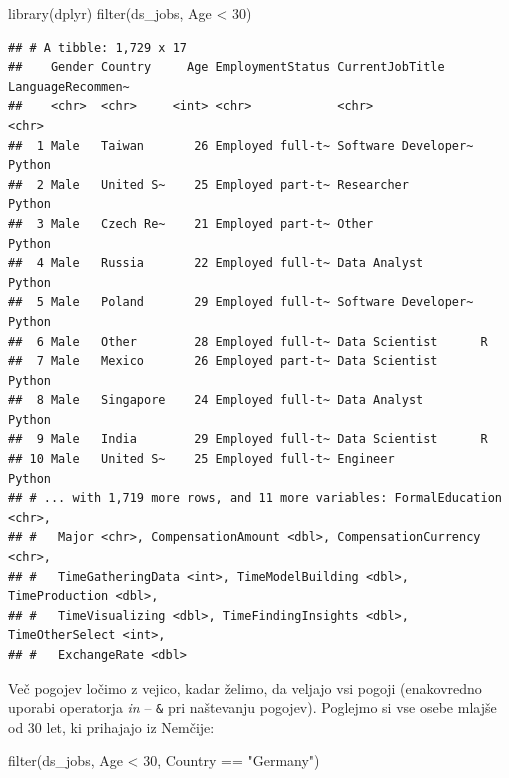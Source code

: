 \documentclass[
]{book}
\newenvironment{Shaded}{\begin{snugshade}}{\end{snugshade}}
\newcommand{\DecValTok}[1]{\textcolor[rgb]{0.00,0.00,0.81}{#1}}
\newcommand{\FunctionTok}[1]{\textcolor[rgb]{0.00,0.00,0.00}{#1}}
\newcommand{\NormalTok}[1]{#1}
\newcommand{\SpecialCharTok}[1]{\textcolor[rgb]{0.00,0.00,0.00}{#1}}
\newcommand{\StringTok}[1]{\textcolor[rgb]{0.31,0.60,0.02}{#1}}
\begin{document}
\begin{Shaded}
\begin{Highlighting}[]
\FunctionTok{library}\NormalTok{(dplyr)}
\FunctionTok{filter}\NormalTok{(ds\_jobs, Age }\SpecialCharTok{\textless{}} \DecValTok{30}\NormalTok{)}
\end{Highlighting}
\end{Shaded}

\begin{verbatim}
## # A tibble: 1,729 x 17
##    Gender Country     Age EmploymentStatus CurrentJobTitle     LanguageRecommen~
##    <chr>  <chr>     <int> <chr>            <chr>               <chr>            
##  1 Male   Taiwan       26 Employed full-t~ Software Developer~ Python           
##  2 Male   United S~    25 Employed part-t~ Researcher          Python           
##  3 Male   Czech Re~    21 Employed part-t~ Other               Python           
##  4 Male   Russia       22 Employed full-t~ Data Analyst        Python           
##  5 Male   Poland       29 Employed full-t~ Software Developer~ Python           
##  6 Male   Other        28 Employed full-t~ Data Scientist      R                
##  7 Male   Mexico       26 Employed part-t~ Data Scientist      Python           
##  8 Male   Singapore    24 Employed full-t~ Data Analyst        Python           
##  9 Male   India        29 Employed full-t~ Data Scientist      R                
## 10 Male   United S~    25 Employed full-t~ Engineer            Python           
## # ... with 1,719 more rows, and 11 more variables: FormalEducation <chr>,
## #   Major <chr>, CompensationAmount <dbl>, CompensationCurrency <chr>,
## #   TimeGatheringData <int>, TimeModelBuilding <dbl>, TimeProduction <dbl>,
## #   TimeVisualizing <dbl>, TimeFindingInsights <dbl>, TimeOtherSelect <int>,
## #   ExchangeRate <dbl>
\end{verbatim}

Več pogojev ločimo z vejico, kadar želimo, da veljajo vsi pogoji (enakovredno uporabi operatorja \emph{in} -- \texttt{\&} pri naštevanju pogojev). Poglejmo si vse osebe mlajše od 30 let, ki prihajajo iz Nemčije:

\begin{Shaded}
\begin{Highlighting}[]
\FunctionTok{filter}\NormalTok{(ds\_jobs, Age }\SpecialCharTok{\textless{}} \DecValTok{30}\NormalTok{, Country }\SpecialCharTok{==} \StringTok{"Germany"}\NormalTok{)}
\end{Highlighting}
\end{Shaded}
\end{document}
